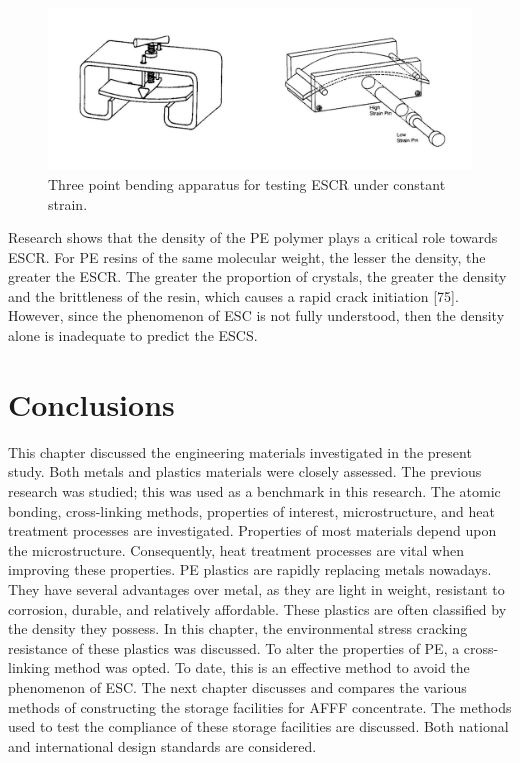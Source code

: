 \documentclass[12pt]{report}
\begin{document}
\begin{figure}[H]
    \centering
    \includegraphics[width=.8\textwidth]{three_point_bending_apparatus_for_testing_escr.jpg}
    \caption{Three point bending apparatus for testing ESCR under constant strain. \cite{choi2009modeling}}
    \label{ch3:figure:bending_apparatus}
\end{figure}

Research shows that the density of the PE polymer plays a critical role towards ESCR. For PE resins of the same molecular weight, the lesser the density, the greater the ESCR. The greater the proportion of crystals, the greater the density and the brittleness of the resin, which causes a rapid crack initiation [75]. However, since the phenomenon of ESC is not fully understood, then the density alone is inadequate to predict the ESCS. 

\section{Conclusions}
This chapter discussed the engineering materials investigated in the present study. Both metals and plastics materials were closely assessed. The previous research was studied; this was used as a benchmark in this research. The atomic bonding, cross-linking methods, properties of interest, microstructure, and heat treatment processes are investigated. Properties of most materials depend upon the microstructure. Consequently, heat treatment processes are vital when improving these properties.
PE plastics are rapidly replacing metals nowadays. They have several advantages over metal, as they are light in weight, resistant to corrosion, durable, and relatively affordable. These plastics are often classified by the density they possess. In this chapter, the environmental stress cracking resistance of these plastics was discussed. To alter the properties of PE, a cross-linking method was opted. To date, this is an effective method to avoid the phenomenon of ESC.
The next chapter discusses and compares the various methods of constructing the storage facilities for AFFF concentrate. The methods used to test the compliance of these storage facilities are discussed. Both national and international design standards are considered.
\end{document}

